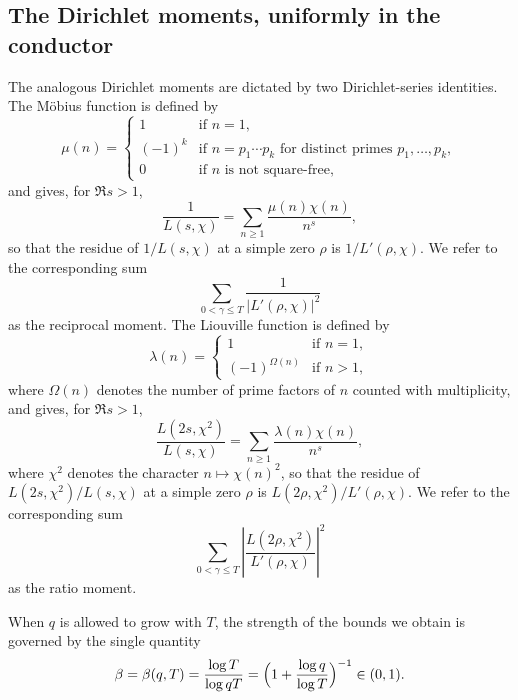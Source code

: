 \documentclass[12pt,a4paper,reqno]{amsart}
\theoremstyle{remark}
\numberwithin{equation}{section}
\begin{document}
\subsection{The Dirichlet moments, uniformly in the conductor}
The analogous Dirichlet moments are dictated by two Dirichlet-series identities. The M\"obius function is defined by
\[
\mu(n)=
\begin{cases}
1 & \text{if } n=1,\\
(-1)^{k} & \text{if } n=p_1\dotsm p_k \text{ for distinct primes } p_1,\dotsc,p_k,\\
0 & \text{if } n \text{ is not square-free},
\end{cases}
\]
and gives, for $\Re s>1$,
\begin{equation}\label{eq:mobius-id}
\frac{1}{L(s,\chi)}=\sum_{n\ge1}\frac{\mu(n)\chi(n)}{n^{s}},
\end{equation}
so that the residue of $1/L(s,\chi)$ at a simple zero $\rho$ is $1/L'(\rho,\chi)$. We refer to the corresponding sum 
$$\sum_{0<\gamma\le T}\frac{1}{|L'(\rho,\chi)|^2}$$
as the reciprocal moment. The Liouville function is defined by 
\begin{equation*}
\lambda(n) =
\begin{cases}
1 & \text{if } n = 1, \\
(-1)^{\Omega(n)} & \text{if } n > 1,
\end{cases}
\end{equation*}
where $\Omega(n)$ denotes the number of prime factors of $n$ counted with multiplicity, and gives, for $\Re s>1$,
\begin{equation}\label{eq:liouville-id}
\frac{L(2s,\chi^2)}{L(s,\chi)} = \sum_{n\ge1}\frac{\lambda(n)\chi(n)}{n^s},
\end{equation}
where $\chi^2$ denotes the character $n\mapsto\chi(n)^2$, so that the residue of $L(2s,\chi^2)/L(s,\chi)$ at a simple zero $\rho$ is $L(2\rho,\chi^2)/L'(\rho,\chi)$. We refer to the corresponding sum 
$$\sum_{0<\gamma\le T}\left|\frac{L(2\rho,\chi^2)}{L'(\rho,\chi)}\right|^2$$ 
as the ratio moment.

When $q$ is allowed to grow with $T$, the strength of the bounds we obtain is governed by the single quantity
\begin{equation}\label{eq:beta}
\beta=\beta(q,T)=\frac{\log T}{\log qT}=\Bigl(1+\frac{\log q}{\log T}\Bigr)^{-1}\in(0,1).
\end{equation}
\end{document}
